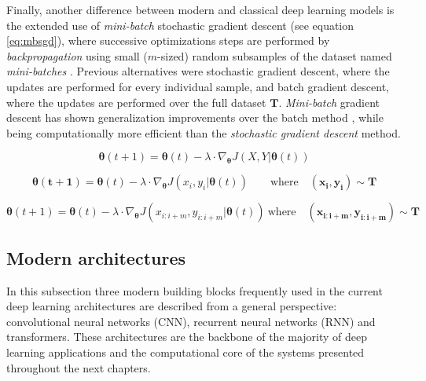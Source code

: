 Finally, another difference between modern and classical deep learning models is the extended use of \textit{mini-batch} stochastic gradient descent (see equation \ref{eq:mbsgd}), where successive optimizations steps are performed by \textit{backpropagation} using small ($m$-sized) random subsamples of the dataset named \textit{mini-batches} \autocite{ruder2016}. Previous alternatives were stochastic gradient descent, where the updates are performed for every individual sample, and batch gradient descent, where the updates are performed over the full dataset $\mathbf{T}$. \textit{Mini-batch} gradient descent has shown generalization improvements over the batch method \autocite{Hoffer2017}, while being computationally more efficient than the \textit{stochastic gradient descent} method.


\begin{equation}
	\label{eq:bgd}
	\mathbf{\theta}(t+1) = \mathbf{\theta}(t) - \lambda \cdot \nabla_\mathbf{\theta} J(X, Y|\mathbf{\theta}(t))
\end{equation}

\begin{equation}
	\label{eq:sgd}
	\mathbf{\theta(t+1)} = \mathbf{\theta}(t) - \lambda \cdot \nabla_\mathbf{\theta} J(x_i, y_i|\mathbf{\theta}(t)) \quad \mathrm \quad \mathrm{where} \quad (\mathbf{x_i}, \mathbf{y_i}) \sim \mathbf{T}
\end{equation}

\begin{equation}
	\label{eq:mbsgd}
	\mathbf{\theta}(t+1) = \mathbf{\theta}(t) - \lambda \cdot \nabla_\mathbf{\theta} J(x_{i:i+m}, y_{i:i+m}|\mathbf{\theta}(t)) \  \mathrm{where} \quad  (\mathbf{x_{i:i+m}}, \mathbf{y_{i:i+m}}) \sim \mathbf{T}
\end{equation}


\subsection{Modern architectures}
In this subsection three modern building blocks frequently used in the current deep learning architectures are described from a general perspective: convolutional neural networks (CNN), recurrent neural networks (RNN) and transformers. These architectures are the backbone of the majority of deep learning applications and the computational core of the systems presented throughout the next chapters.

